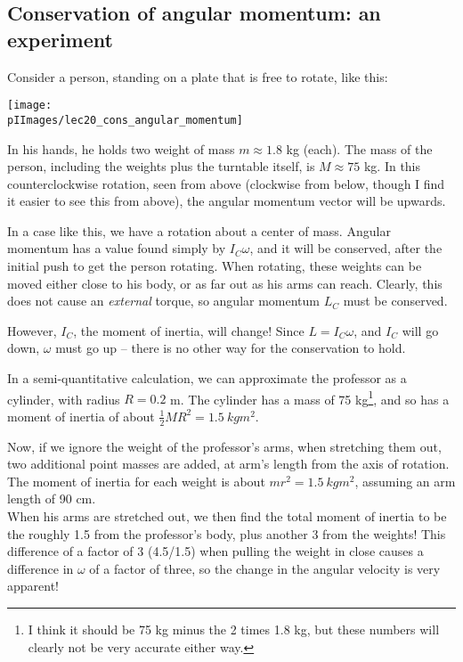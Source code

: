 \subsection{Conservation of angular momentum: an experiment}

Consider a person, standing on a plate that is free to rotate, like this:

\begin{center}
\texttt{[image: \\pIImages/lec20\_cons\_angular\_momentum]}
\end{center}

In his hands, he holds two weight of mass $m \approx 1.8$ kg (each). The mass of the person, including the weights plus the turntable itself, is $M \approx 75$ kg.
In this counterclockwise rotation, seen from above (clockwise from below, though I find it easier to see this from above), the angular momentum vector will be upwards.

In a case like this, we have a rotation about a center of mass. Angular momentum has a value found simply by $I_C \omega$, and it will be conserved, after the initial push to get the person rotating. When rotating, these weights can be moved either close to his body, or as far out as his arms can reach. Clearly, this does not cause an \emph{external} torque, so angular momentum $L_C$ must be conserved.

However, $I_C$, the moment of inertia, will change! Since $L = I_C \omega$, and $I_C$ will go down, $\omega$ must go up -- there is no other way for the conservation to hold.

In a semi-quantitative calculation, we can approximate the professor as a cylinder, with radius $R = 0.2$ m. The cylinder has a mass of 75 kg\footnote{I think it should be 75 kg minus the 2 times 1.8 kg, but these numbers will clearly not be very accurate either way.}, and so has a moment of inertia of about $\frac{1}{2} M R^2 = \SI{1.5}{kg m^2}$.

Now, if we ignore the weight of the professor's arms, when stretching them out, two additional point masses are added, at arm's length from the axis of rotation. The moment of inertia for each weight is about $m r^2 = \SI{1.5}{kg m^2}$, assuming an arm length of 90 cm.\\
When his arms are stretched out, we then find the total moment of inertia to be the roughly 1.5 from the professor's body, plus another 3 from the weights! This difference of a factor of 3 (4.5/1.5) when pulling the weight in close causes a difference in $\omega$ of a factor of three, so the change in the angular velocity is very apparent!

